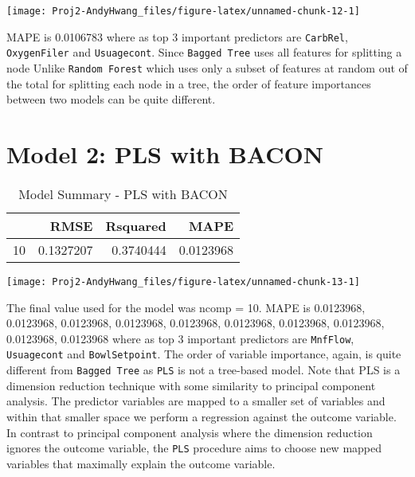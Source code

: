 \documentclass[]{report}
\begin{document}
\begin{center}\texttt{[image: Proj2-AndyHwang\_files/figure-latex/unnamed-chunk-12-1]} \end{center}

MAPE is 0.0106783 where as top 3 important predictors are
\texttt{CarbRel}, \texttt{OxygenFiler} and \texttt{Usuagecont}. Since
\texttt{Bagged\ Tree} uses all features for splitting a node Unlike
\texttt{Random\ Forest} which uses only a subset of features at random
out of the total for splitting each node in a tree, the order of feature
importances between two models can be quite different.

\section{Model 2: PLS with BACON}\label{model-2-pls-with-bacon}

\begin{table}[H]

\caption{\label{tab:unnamed-chunk-13}Model Summary - PLS with BACON}
\centering
\fontsize{8}{10}\selectfont
\begin{tabular}[t]{lrrr}
\toprule
\textbf{ } & \textbf{RMSE} & \textbf{Rsquared} & \textbf{MAPE}\\
\midrule
\rowcolor{gray!6}  10 & 0.1327207 & 0.3740444 & 0.0123968\\
\bottomrule
\end{tabular}
\end{table}

\begin{center}\texttt{[image: Proj2-AndyHwang\_files/figure-latex/unnamed-chunk-13-1]} \end{center}

The final value used for the model was ncomp = 10. MAPE is 0.0123968,
0.0123968, 0.0123968, 0.0123968, 0.0123968, 0.0123968, 0.0123968,
0.0123968, 0.0123968, 0.0123968 where as top 3 important predictors are
\texttt{MnfFlow}, \texttt{Usuagecont} and \texttt{BowlSetpoint}. The
order of variable importance, again, is quite different from
\texttt{Bagged\ Tree} as \texttt{PLS} is not a tree-based model. Note
that PLS is a dimension reduction technique with some similarity to
principal component analysis. The predictor variables are mapped to a
smaller set of variables and within that smaller space we perform a
regression against the outcome variable. In contrast to principal
component analysis where the dimension reduction ignores the outcome
variable, the \texttt{PLS} procedure aims to choose new mapped variables
that maximally explain the outcome variable.
\end{document}
